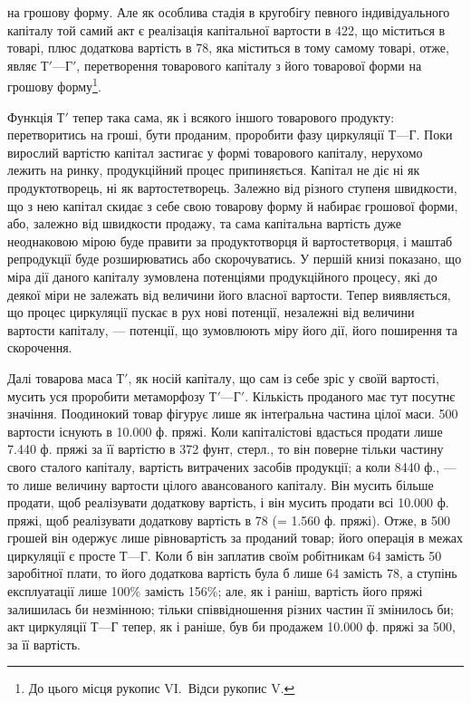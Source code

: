 \parcont{}  %
на грошову форму. Але як особлива стадія в кругобігу певного індивідуального
капіталу той самий акт є реалізація капітальної вартости
в 422, що міститься в товарі, плюс додаткова вартість в 78, яка міститься в тому самому товарі, отже, являє $Т' — Г'$, перетворення
товарового капіталу з його товарової форми на грошову форму\footnote{
До цього місця рукопис VI.~Відси рукопис V.
}.

Функція $Т'$ тепер така сама, як і всякого іншого товарового продукту:
перетворитись на гроші, бути проданим, проробити фазу циркуляції
$Т — Г$. Поки вирослий вартістю капітал застигає у формі товарового
капіталу, нерухомо лежить на ринку, продукційний процес припиняється.
Капітал не діє ні як продуктотворець, ні як вартостетворець. Залежно від
різного ступеня швидкости, що з нею капітал скидає з себе свою товарову
форму й набирає грошової форми, або, залежно від швидкости продажу,
та сама капітальна вартість дуже неоднаковою мірою буде правити за
продуктотворця й вартостетворця, і маштаб репродукції буде розширюватись
або скорочуватись. У першій книзі показано, що міра дії даного
капіталу зумовлена потенціями продукційного процесу, які до деякої
міри не залежать від величини його власної вартости. Тепер виявляється,
що процес циркуляції пускає в рух нові потенції, незалежні від величини
вартости капіталу, — потенції, що зумовлюють міру його дії, його поширення
та скорочення.

Далі товарова маса $Т'$, як носій капіталу, що сам із себе зріс у своїй
вартості, мусить уся проробити метаморфозу $Т' — Г'$. Кількість проданого
має тут посутнє значіння. Поодинокий товар фігурує лише як інтеґральна
частина цілої маси. 500 вартости існують в \num{10.000} ф. пряжі.
Коли капіталістові вдасться продати лише \num{7.440} ф. пряжі за її вартістю
в 372 фунт, стерл., то він поверне тільки частину свого сталого капіталу,
вартість витрачених засобів продукції; а коли 8440 ф., — то лише величину
вартости цілого авансованого капіталу. Він мусить більше продати, щоб
реалізувати додаткову вартість, і він мусить продати всі \num{10.000} ф.
пряжі, щоб реалізувати додаткову вартість в 78 (= \num{1.560} ф.
пряжі). Отже, в 500 грошей він одержує лише рівновартість
за проданий товар; його операція в межах циркуляції є просте $Т — Г$.
Коли б він заплатив своїм робітникам 64 замість 50
заробітної плати, то його додаткова вартість була б лише 64
замість 78, а ступінь експлуатації лише 100\% замість
156\%; але, як і раніш, вартість його пряжі залишилась би незмінною;
тільки співвідношення різних частин її змінилось би; акт циркуляції $Т — Г$
тепер, як і раніше, був би продажем \num{10.000} ф. пряжі за 500,
за її вартість.

